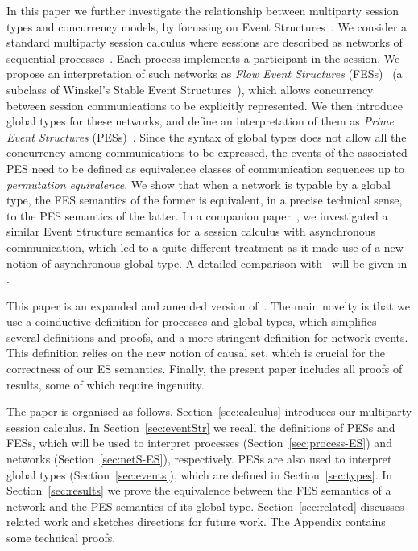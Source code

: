 In this paper we further investigate the relationship between
multiparty session types and concurrency models, by focussing on Event
Structures~\cite{Win88}.  We consider a standard multiparty session
calculus where sessions are described as networks of sequential
processes~\cite{DY12}.  Each process implements a participant in the
session.  We propose an interpretation of such networks as \emph{Flow
  Event Structures} (FESs)~\cite{BC88a,BC94} (a subclass of Winskel's
Stable Event Structures~\cite{Win88}), which allows concurrency
between session communications to be explicitly represented. We then
introduce global types for these networks, and define an
interpretation of them as \emph{Prime Event Structures}
(PESs)~\cite{Win80,NPW81}. Since the syntax of global types does not
allow all the concurrency among communications to be expressed, the
events of the associated PES need to be defined as equivalence classes
of communication sequences up to \emph{permutation equivalence}. We
show that when a network is typable by a global type, the FES
semantics of the former is equivalent, in a precise technical sense,
to the PES semantics of the latter.  In a companion
paper~\cite{CDG21}, we investigated a similar Event Structure
semantics for a session calculus with asynchronous communication,
which led to a quite different treatment as it made use of a new
notion of asynchronous global type. A detailed comparison
with~\cite{CDG21} will be given in .

 This paper is an expanded and amended version
of~\cite{CDG-LNCS19}. The main novelty is that we use a coinductive
definition for processes and global types, which simplifies several
definitions and proofs, and a more stringent definition for network
events. This definition relies on the new notion of causal set, 
which is crucial for the correctness of our ES semantics.
Finally, the present paper includes all proofs
of results, some of which require ingenuity. 

The paper is organised as follows. Section~\ref{sec:calculus}
introduces our multiparty session calculus.  In
Section~\ref{sec:eventStr} we recall the definitions of PESs and FESs,
which will be used to interpret processes
(Section~\ref{sec:process-ES}) and networks
(Section~\ref{sec:netS-ES}), respectively.  PESs are also used to
interpret global types (Section~\ref{sec:events}), which are defined
in Section~\ref{sec:types}. In Section~\ref{sec:results} we prove the
equivalence between the FES semantics of a network and the PES
semantics of its global type.  Section~\ref{sec:related} discusses
related work %
and sketches directions for future work.  The Appendix contains some technical proofs. 






 
 

